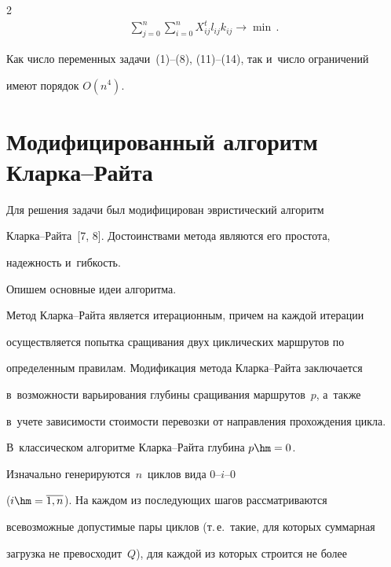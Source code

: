 \begin{multicols}{2}
\begin{multline}
\sum\limits_{j=0}^n \sum\limits_{i=0}^n X_{ij}^t l_{ij} k_{ij}\to \min\,.


  \label{e14-br}


  \end{multline}





  Как число переменных задачи~(1)--(8), (11)--(14), так и~число ограничений


имеют порядок $O(n^4)$.





\section{Модифицированный алгоритм Кларка--Райта}





  Для решения задачи был модифицирован эвристический алгоритм


  Клар\-ка--Рай\-та~[7, 8]. Достоинствами метода являются его простота,


надежность и~гибкость.





  Опишем основные идеи алгоритма.





  Метод Кларка--Райта является итерационным, причем на каждой итерации


осуществляется попытка сращивания двух циклических маршрутов по


определенным правилам. Модификация метода Клар\-ка--Рай\-та заключается


в~возможности варьирования глубины сращивания маршрутов~$p$, а~также


в~учете зависимости стоимости перевозки от направления прохождения цикла.


В~классическом алгоритме Клар\-ка--Рай\-та глубина $p\hm=0$.





  Изначально генерируются~$n$~цик\-лов вида 0--$i$--0


($i\hm=\overline{1,n}$). На каждом из последующих шагов рассматриваются


всевозможные допустимые пары циклов (т.\,е.\ такие, для которых суммарная


загрузка не превосходит~$Q$), для каждой из которых строится не более



\end{multicols}
